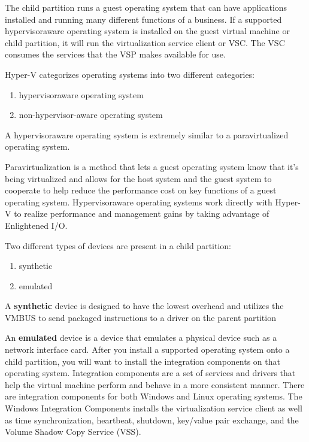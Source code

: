 The child partition \cite{BOOK:1} runs a guest operating system that can have applications installed and running many different functions of a business. If a supported hypervisoraware operating system is installed on the guest virtual machine or child partition, it will run the virtualization service client or VSC. The VSC consumes the services that the VSP makes available for use.

\vspace{5mm}

Hyper-V categorizes operating systems into two different categories:
\begin{enumerate}
	\item hypervisoraware operating system 
	\item non-hypervisor-aware operating system
\end{enumerate}

\vspace{5mm}

A hypervisoraware operating system is extremely similar to a paravirtualized operating system.

\vspace{5mm}

Paravirtualization is a method that lets a guest operating system know that it’s being virtualized and allows for the host system and the guest system to cooperate to help
reduce the performance cost on key functions of a guest operating system. Hypervisoraware operating systems work directly with Hyper-V to realize performance and management gains by taking advantage of Enlightened I/O.

\vspace{5mm}

Two different types of devices are present in a child partition:
\vspace{5mm}
\begin{enumerate}
	\item synthetic
	\item emulated
\end{enumerate}


A \textbf{synthetic} device is designed to have the lowest overhead and utilizes the VMBUS to send packaged instructions to a driver on the parent partition

\vspace{5mm}

An \textbf{emulated} device is a device that emulates a physical device such as a network interface card. After you install a supported operating system onto a child partition, 
you will want to install the integration components on that operating system. Integration components are a set of services and drivers that help the virtual machine perform and behave 
in a more consistent manner. There are integration components for both Windows and Linux operating systems. The Windows Integration Components installs the virtualization service client 
as well as time synchronization, heartbeat, shutdown, key/value pair exchange, and the Volume Shadow Copy Service (VSS).

